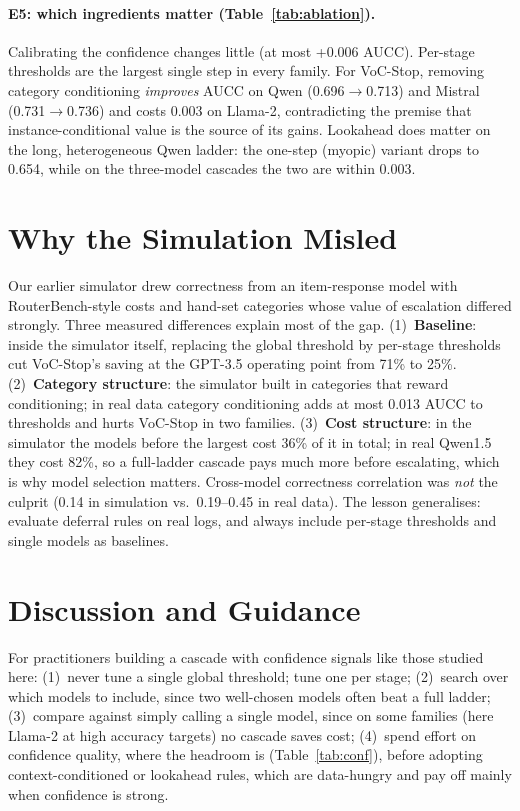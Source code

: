 \documentclass[10pt,twocolumn]{article}
\begin{document}
\paragraph{E5: which ingredients matter (Table~\ref{tab:ablation}).} Calibrating the confidence
changes little (at most +0.006 AUCC). Per-stage thresholds are the largest single step in every
family. For VoC-Stop, removing category conditioning \emph{improves} AUCC on Qwen (0.696$\to$0.713)
and Mistral (0.731$\to$0.736) and costs 0.003 on Llama-2, contradicting the premise that
instance-conditional value is the source of its gains. Lookahead does matter on the long, heterogeneous
Qwen ladder: the one-step (myopic) variant drops to 0.654, while on the three-model cascades the two
are within 0.003.


\section{Why the Simulation Misled}\label{sec:sim}
Our earlier simulator drew correctness from an item-response model with RouterBench-style costs and
hand-set categories whose value of escalation differed strongly. Three measured differences explain
most of the gap. (1)~\textbf{Baseline}: inside the simulator itself, replacing the global threshold
by per-stage thresholds cut VoC-Stop's saving at the GPT-3.5 operating point from 71\% to 25\%.
(2)~\textbf{Category structure}: the simulator built in categories that reward conditioning; in real
data category conditioning adds at most 0.013 AUCC to thresholds and hurts VoC-Stop in two families.
(3)~\textbf{Cost structure}: in the simulator the models before the largest cost 36\% of it in total;
in real Qwen1.5 they cost 82\%, so a full-ladder cascade pays much more before escalating, which is
why model selection matters. Cross-model correctness correlation was \emph{not} the culprit (0.14 in
simulation vs.\ 0.19--0.45 in real data). The lesson generalises: evaluate deferral rules on real logs,
and always include per-stage thresholds and single models as baselines.

\section{Discussion and Guidance}\label{sec:discussion}
For practitioners building a cascade with confidence signals like those studied here: (1)~never tune a
single global threshold; tune one per stage; (2)~search over which models to include, since two
well-chosen models often beat a full ladder; (3)~compare against simply calling a single model, since
on some families (here Llama-2 at high accuracy targets) no cascade saves cost; (4)~spend effort on
confidence quality, where the headroom is (Table~\ref{tab:conf}), before adopting context-conditioned
or lookahead rules, which are data-hungry and pay off mainly when confidence is strong.
\end{document}
